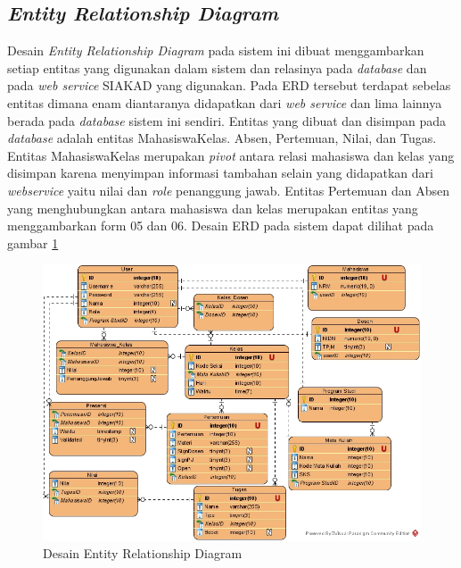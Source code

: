 \subsection{\textit{Entity Relationship Diagram}}
	Desain \textit{Entity Relationship Diagram} pada sistem ini dibuat menggambarkan setiap entitas yang digunakan dalam sistem dan relasinya pada \textit{database} dan pada \textit{web service} SIAKAD yang digunakan. Pada ERD tersebut terdapat sebelas entitas dimana enam diantaranya didapatkan dari \textit{web service} dan lima lainnya berada pada \textit{database} sistem ini sendiri. Entitas yang dibuat dan disimpan pada \textit{database} adalah entitas MahasiswaKelas. Absen, Pertemuan, Nilai, dan Tugas. Entitas MahasiswaKelas merupakan \textit{pivot} antara relasi mahasiswa dan kelas yang disimpan karena menyimpan informasi tambahan selain yang didapatkan dari \textit{webservice} yaitu nilai dan \textit{role} penanggung jawab. Entitas Pertemuan dan Absen yang menghubungkan antara mahasiswa dan kelas merupakan entitas yang menggambarkan form 05 dan 06. Desain ERD pada sistem dapat dilihat pada gambar \ref{fig:erd}

\begin{figure}[h!]
	\centering
	\includegraphics[width=1\textwidth]{gambar/diagram/Entity Relationship Diagram2}
	\caption{Desain Entity Relationship Diagram}
	\label{fig:erd}
\end{figure}

